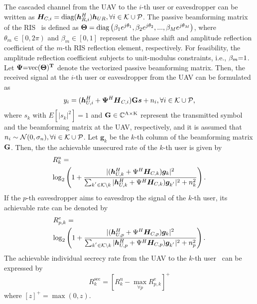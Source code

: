 \documentclass[journal]{IEEEtran}
\begin{document}
The cascaded channel from the UAV to the $i$-th user or eavesdropper can be written as $ \bm{H}_{C,i}=\text{diag}(\bm{h}_{R,i}^H)\bm{h}_{UR},\forall i \in {\cal K}\cup {\cal P}$. The passive beamforming matrix of the RIS~\cite{passive-beamforming-1} is defined as ${\bf{\Theta }} = {\rm{diag}}\left( {{\beta _1}{e^{j{\theta _1}}},{\beta _2}{e^{j{\theta _2}}},...,{\beta _M}{e^{j{\theta _M}}}} \right)$, where ${\theta _m} \in \left[ {\left. {0,2\pi } \right)} \right.$ and ${\beta _m} \in \left[ {0,1} \right]$ represent the phase shift and amplitude reflection coefficient of the $m$-th RIS reflection element, respectively. For feasibility, the amplitude reflection coefficient subjects to unit-modulus constraints, i.e., ${\beta _m} {\rm =}1 $. Let $\bm{\Psi}{\rm =}\text{vec}(\bf{\Theta})^T $ denote the vectorized passive beamforming matrix. Then, the received signal at the $i$-th user or eavesdropper from the UAV can be formulated as
\begin{equation}\label{received-1}
  y_i=({\bm{h}}_{U,i}^H+{\bm{\Psi}^{H}\bm{H}}_{C,i}){\bf{G}}{\bm{s}}+ {{n}_{i}},\forall i\in {\cal K}\cup{\cal P},
\end{equation}
\noindent where $ s_k$ with $E[|s_k|^2]=1 $ and $ {\bf{G}} \in \mathbb{C}^{\text{A} \times \text{K}}$ represent the transmitted symbol and the beamforming matrix at the UAV, respectively, and it is assumed that $ n_i \sim {\cal N}(0,\sigma_n),\forall i \in {\cal K}\cup {\cal P}$. Let $\bm{g}_k$ be the $k$-th column of the beamforming matrix $\bf{G}$. Then, the the achievable unsecured rate of the $k$-th user is given by
\begin{equation}\label{unsecure-1}
  \begin{aligned}
  &R_k^u = \\
  &{\rm log}_2\left(1+\frac{|(\bm{h}_{U, k}^{H}+\Psi^{H} \bm{H}_{C, k})\bm{g}_k|^2}{\sum_{k^{'} \in {\cal K}\backslash k}  | {}\bm{h}_{U, k}^{H}+\Psi^{H} \bm{H}_{C, k})\bm{g}_{k^{'}} |^2+n_k^2}\right).
  \end{aligned}
\end{equation}
If the $p$-th eavesdropper aims to eavesdrop the signal of the $k$-th user, its achievable rate can be denoted by 
\begin{equation}\label{eavesdrop-1}
  \begin{aligned}
    &R_{p,k}^e = \\
    &{\rm log}_2\left(1+\frac{|(\bm{h}_{U, p}^{H}+\Psi^{H} \bm{H}_{C, p})\bm{g}_k|^2}{\sum_{k^{'} \in {\cal K}\backslash k}  | {}\bm{h}_{U, p}^{H}+\Psi^{H} \bm{H}_{C, p})\bm{g}_{k^{'}} |^2+n_p^2}\right).
  \end{aligned}
\end{equation}
The achievable individual secrecy rate from the UAV to the $k$-th user~\cite{secure-1} can be expressed by
\begin{equation}\label{secure}
  R_{k}^{\mathrm{sec}}=\left[R_{k}^{\mathrm{u}}-\max _{\forall p} R_{p, k}^{\mathrm{e}}\right]^{+}
\end{equation}
where $[z]^{+}=\max (0, z)$.
\end{document}
